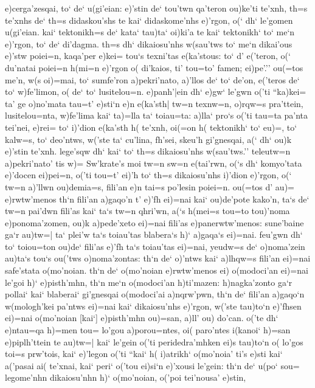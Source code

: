 \documentclass[11pt]{book}
\newcommand {\Spag} {\Npag*{=+1}\Npar{1}\numerus{1}}
\newcommand {\Spar} {\Npar*{=+1}\numerus{1}}
\begin{document}
e)cerga'zesqai, to` de` u(gi'eian: e)'stin de` tou'twn qa'teron ou)ke'ti
te'xnh, th=s te'xnhs de` th=s didaskou'shs te kai` didaskome'nhs e)'rgon,
o(` dh` le'gomen u(gi'eian. kai` tektonikh=s de` kata` tau)ta` oi)ki'a te
kai` tektonikh` to` me`n e)'rgon, to` de` di'dagma. th=s dh` dikaiosu'nhs
w(sau'tws to` me`n dikai'ous e)'stw poiei=n, kaqa'per e)kei= tou`s
texni'tas e(ka'stous: to` d' e('teron, o(` du'natai poiei=n
\Spar
h(mi=n e)'rgon o( di'kaios, ti' tou=to' famen; ei)pe'.'' ou(=tos
me'n, w(s oi)=mai, to` sumfe'ron a)pekri'nato, a)'llos de` to` de'on,
e('teros de` to` w)fe'limon, o( de` to` lusitelou=n. e)panh'|ein dh` e)gw`
le'gwn o('ti ``ka)kei= ta' ge o)no'mata tau=t' e)sti`n e)n e(ka'sth| tw=n
texnw=n, o)rqw=s pra'ttein, lusitelou=nta, w)fe'lima kai` ta)=lla ta`
toiau=ta: a)lla` pro`s o('ti tau=ta pa'nta tei'nei, e)rei= to` i)'dion
e(ka'sth h( te'xnh, oi(=on h( tektonikh` to` eu)=, to` kalw=s, to`
deo'ntws, w('ste
\Spar
ta` cu'lina, fh'sei, skeu'h gi'gnesqai, a(` dh` ou)k e)'stin
te'xnh. lege'sqw dh` kai` to` th=s dikaiosu'nhs w(sau'tws.'' teleutw=n
a)pekri'nato' tis w)= Sw'krate's moi tw=n sw=n e(tai'rwn, o(`s dh`
komyo'tata e)'docen ei)pei=n, o('ti tou=t' ei)'h to` th=s dikaiosu'nhs
i)'dion e)'rgon, o(` tw=n a)'llwn ou)demia=s, fili'an e)n tai=s po'lesin
poiei=n. ou(=tos d' au)= e)rwtw'menos th`n fili'an a)gaqo'n t' e)'fh
ei)=nai kai` ou)de'pote kako'n, ta`s de` tw=n pai'dwn fili'as kai` ta`s
tw=n qhri'wn, a(`s h(mei=s tou=to tou)'noma e)ponoma'zomen, ou)k
a)pede'xeto ei)=nai fili'as e)panerwtw'menos: sune'baine ga`r au)tw=|
\Spar
ta` plei'w ta`s toiau'tas blabera`s h)` a)gaqa`s ei)=nai. feu'gwn
dh` to` toiou=ton ou)de` fili'as e)'fh ta`s toiau'tas ei)=nai, yeudw=s de`
o)noma'zein au)ta`s tou`s ou('tws o)noma'zontas: th`n de` o)'ntws kai`
a)lhqw=s fili'an ei)=nai safe'stata o(mo'noian. th`n de` o(mo'noian
e)rwtw'menos ei) o(modoci'an ei)=nai le'goi h)` e)pisth'mhn, th`n me`n
o(modoci'an h)ti'mazen: h)nagka'zonto ga`r pollai` kai` blaberai`
gi'gnesqai o(modoci'ai a)nqrw'pwn, th`n de` fili'an a)gaqo`n w(mologh'kei
pa'ntws ei)=nai kai` dikaiosu'nhs e)'rgon, w('ste tau)to`n e)'fhsen
ei)=nai o(mo'noian [kai`] e)pisth'mhn ou)=san, a)ll' ou) do'can. o('te dh`
e)ntau=qa h)=men tou= lo'gou a)porou=ntes,
\Spag
oi( paro'ntes i(kanoi` h)=san e)piplh'ttein te au)tw=| kai` le'gein
o('ti peridedra'mhken ei)s tau)to`n o( lo'gos toi=s prw'tois, kai`
e)'legon o('ti ``kai` h( i)atrikh` o(mo'noia' ti's e)sti kai` a('pasai
ai( te'xnai, kai` peri` o('tou ei)si`n e)'xousi le'gein: th`n de` u(po`
sou= legome'nhn dikaiosu'nhn h)` o(mo'noian, o('poi tei'nousa' e)stin,
\end{document}

